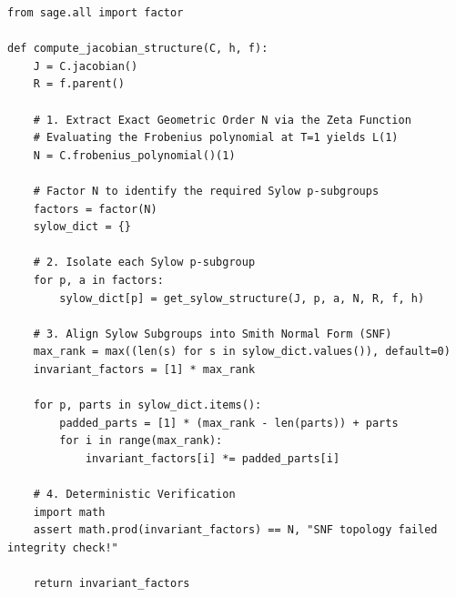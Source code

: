 \documentclass[letterpaper, 11pt]{article}
\begin{document}
\begin{lstlisting}
from sage.all import factor

def compute_jacobian_structure(C, h, f):
    J = C.jacobian()
    R = f.parent()
    
    # 1. Extract Exact Geometric Order N via the Zeta Function
    # Evaluating the Frobenius polynomial at T=1 yields L(1)
    N = C.frobenius_polynomial()(1)
    
    # Factor N to identify the required Sylow p-subgroups
    factors = factor(N)
    sylow_dict = {}
    
    # 2. Isolate each Sylow p-subgroup
    for p, a in factors:
        sylow_dict[p] = get_sylow_structure(J, p, a, N, R, f, h)
        
    # 3. Align Sylow Subgroups into Smith Normal Form (SNF)
    max_rank = max((len(s) for s in sylow_dict.values()), default=0)
    invariant_factors = [1] * max_rank
    
    for p, parts in sylow_dict.items():
        padded_parts = [1] * (max_rank - len(parts)) + parts
        for i in range(max_rank):
            invariant_factors[i] *= padded_parts[i]
            
    # 4. Deterministic Verification
    import math
    assert math.prod(invariant_factors) == N, "SNF topology failed integrity check!"
    
    return invariant_factors
\end{lstlisting}
\end{document}
